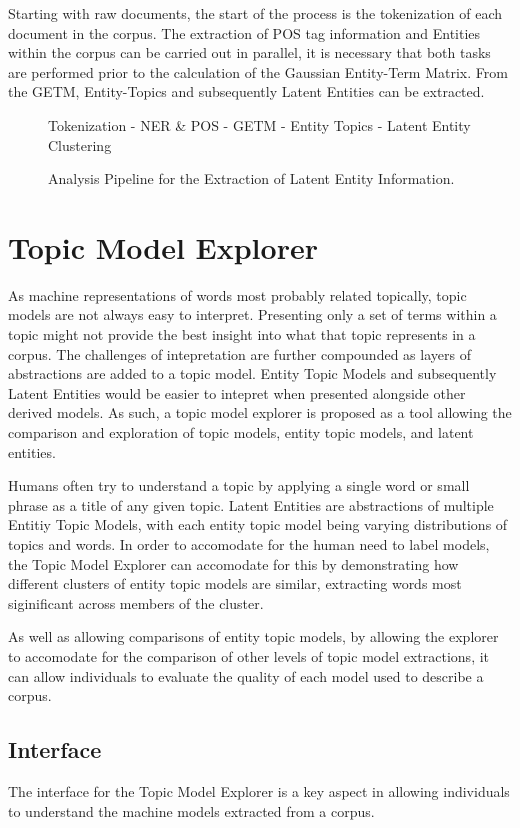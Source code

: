 \documentclass[10pt]{report}
\begin{document}
Starting with raw documents, the start of the process is the tokenization of each document in the corpus. The extraction of POS tag information and Entities within the corpus can be carried out in parallel, it is necessary that both tasks are performed prior to the calculation of the Gaussian Entity-Term Matrix. From the GETM, Entity-Topics and subsequently Latent Entities can be extracted.

\begin{figure}[h!]

  \centering Tokenization - NER \& POS - GETM - Entity Topics - Latent Entity Clustering  
  \caption{Analysis Pipeline for the Extraction of Latent Entity Information.}
\end{figure}

\section{Topic Model Explorer}

As machine representations of words most probably related topically, topic models are not always easy to interpret. Presenting only a set of terms within a topic might not provide the best insight into what that topic represents in a corpus. The challenges of intepretation are further compounded as layers of abstractions are added to a topic model. Entity Topic Models and subsequently Latent Entities would be easier to intepret when presented alongside other derived models. As such, a topic model explorer is proposed as a tool allowing the comparison and exploration of topic models, entity topic models, and latent entities.

Humans often try to understand a topic by applying a single word or small phrase as a title of any given topic. Latent Entities are abstractions of multiple Entitiy Topic Models, with each entity topic model being varying distributions of topics and words. In order to accomodate for the human need to label models, the Topic Model Explorer can accomodate for this by demonstrating how different clusters of entity topic models are similar, extracting words most siginificant across members of the cluster.

As well as allowing comparisons of entity topic models, by allowing the explorer to accomodate for the comparison of other levels of topic model extractions, it can allow individuals to evaluate the quality of each model used to describe a corpus.

\subsection{Interface}
The interface for the Topic Model Explorer is a key aspect in allowing individuals to understand the machine models extracted from a corpus.
\end{document}
